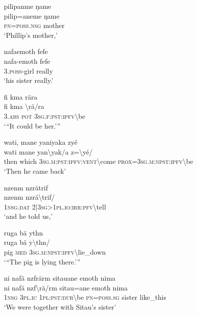 \ea\label{ex:12:a756}
pilipanme ŋame\\
\gll pilip=aneme	ŋame\\
     \textsc{pn}=\textsc{poss}.\textsc{nsg}	mother\\
\glt `Phillip's mother,'
\z

\ea\label{ex:12:a757}
nafaemoth fefe\\
\gll nafa-emoth	fefe\\
     3.\textsc{poss}-girl	really\\
\glt `his sister really.'
\z

\ea\label{ex:12:a758}
fi kma rära\\
\gll fi	kma	{\textbackslash}rä/ra\\
     3.\textsc{abs}	\textsc{pot}	3\textsc{sg}.\textsc{f}:\textsc{pst}:\textsc{ipfv}{\textbackslash}be\\
\glt `{``}It could be her.'''
\z

\ea\label{ex:12:a759}
wati, mane yaniyaka zyé\\
\gll wati	mane	yan{\textbackslash}yak/a	z={\textbackslash}yé/\\
     then	which	3\textsc{sg}.\textsc{m}:\textsc{pst}:\textsc{ipfv}:\textsc{vent}{\textbackslash}come	\textsc{prox}=3\textsc{sg}.\textsc{m}:\textsc{npst}:\textsc{ipfv}{\textbackslash}be\\
\glt `Then he came back'
\z

\ea\label{ex:12:a760}
nzenm nzrätrif\\
\gll nzenm	nzrä{\textbackslash}trif/\\
     1\textsc{nsg}.\textsc{dat}	2|3\textsc{sg}>1\textsc{pl}.\textsc{io}:\textsc{irr}:\textsc{pfv}{\textbackslash}tell\\
\glt `and he told us,'
\z

\ea\label{ex:12:a761}
ruga bä ythn\\
\gll ruga	bä	y{\textbackslash}thn/\\
     pig	\textsc{med}	3\textsc{sg}.\textsc{m}:\textsc{npst}:\textsc{ipfv}{\textbackslash}lie\_down\\
\glt `{``}The pig is lying there.'''
\z

\ea\label{ex:12:a762}
ni nafä nzfrärm sitauane emoth nima\\
\gll ni	nafä	nzf{\textbackslash}rä/rm	sitau=ane	emoth	nima\\
     1\textsc{nsg}	3\textsc{pl}.\textsc{ic}	1\textsc{pl}:\textsc{pst}:\textsc{dur}{\textbackslash}be	\textsc{pn}=\textsc{poss}.\textsc{sg}	sister	like\_this\\
\glt `We were together with Sitau's sister'
\z

